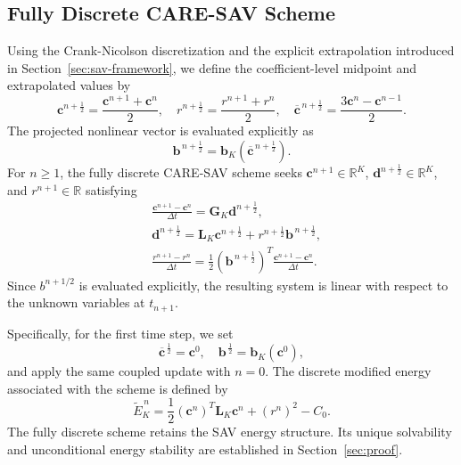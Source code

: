 \documentclass[10pt,reqno]{amsart}
\theoremstyle{remark}
\theoremstyle{definition}
\begin{document}
\subsection{Fully Discrete CARE-SAV Scheme}
Using the Crank-Nicolson discretization and the explicit extrapolation introduced in Section~\ref{sec:sav-framework}, we define the coefficient-level midpoint and extrapolated values by
\begin{equation}
  \boldsymbol{c}^{n+\frac{1}{2}}=\frac{\boldsymbol{c}^{n+1}+\boldsymbol{c}^{n}}{2},\quad
  r^{n+\frac{1}{2}} = \frac{r^{n+1}+r^{n}}{2}, \quad
  \overline{\boldsymbol{c}}^{\,n+\frac12}=\frac{3\boldsymbol{c}^{n}-\boldsymbol{c}^{n-1}}{2}.
\end{equation}
The projected nonlinear vector is evaluated explicitly as
\begin{equation}
  \boldsymbol{b}^{\,n+\frac{1}{2}} = \boldsymbol{b}_K\left( \overline{\boldsymbol{c}}^{\,n+\frac{1}{2}} \right).
\end{equation}
For $n \geq 1$, the fully discrete CARE-SAV scheme seeks $\boldsymbol{c}^{n+1}\in \mathbb{R}^K$, $\boldsymbol{d}^{n+\frac{1}{2}}\in \mathbb{R}^K$, and $r^{n+1}\in \mathbb{R}$ satisfying
\begin{equation}
\begin{aligned}
  &\frac{\boldsymbol{c}^{n+1}-\boldsymbol{c}^{n}}{\Delta t}=\boldsymbol{G}_K\boldsymbol{d}^{n+\frac12},
  \\
  &\boldsymbol{d}^{n+\frac12}=\boldsymbol{L}_K\boldsymbol{c}^{n+\frac12}+r^{n+\frac12}\boldsymbol{b}^{\,n+\frac12},
  \\
  &\frac{r^{n+1}-r^{n}}{\Delta t}=\frac{1}{2}\left(\boldsymbol{b}^{\,n+\frac12}\right)^{T}\frac{\boldsymbol{c}^{n+1}-\boldsymbol{c}^{n}}{\Delta t}.
\end{aligned}
\label{eq:fully_discrete_care_sav}
\end{equation}
Since $b^{n+1/2}$ is evaluated explicitly, the resulting system is linear with respect to the unknown variables at $t_{n+1}$.

Specifically, for the first time step, we set
\begin{equation}
  \overline{\boldsymbol{c}}^{\,\frac12}=\boldsymbol{c}^{0},\quad
  \boldsymbol{b}^{\,\frac12} =\boldsymbol{b}_K(\boldsymbol{c}^{0}),
\end{equation}
and apply the same coupled update with $n=0$. The discrete modified energy associated with the scheme is defined by
\begin{equation}
  \widetilde{E}_K^{\,n}=\frac{1}{2}(\boldsymbol{c}^{n})^{T} \boldsymbol{L}_K \boldsymbol{c}^{n} + (r^{n})^2 -C_0.
\end{equation}
The fully discrete scheme retains the SAV energy structure. Its unique solvability and unconditional energy stability are established in Section~\ref{sec:proof}.
\end{document}
